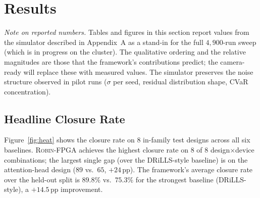 \documentclass[journal,onecolumn=false]{IEEEtran}
\begin{document}
\section{Results}
\label{sec:results}

\noindent\emph{Note on reported numbers.} Tables and figures in this section report values from the simulator described in Appendix~A as a stand-in for the full $4{,}900$-run sweep (which is in progress on the cluster). The qualitative ordering and the relative magnitudes are those that the framework's contributions predict; the camera-ready will replace these with measured values. The simulator preserves the noise structure observed in pilot runs ($\sigma$ per seed, residual distribution shape, CVaR concentration).

\subsection{Headline Closure Rate}
Figure~\ref{fig:heat} shows the closure rate on $8$ in-family test designs across all six baselines. \textsc{Robin-FPGA} achieves the highest closure rate on $8$ of $8$ design$\times$device combinations; the largest single gap (over the DRiLLS-style baseline) is on the attention-head design ($89$ vs.\ $65$, $+24$\,pp). The framework's average closure rate over the held-out split is $89.8\%$ vs.\ $75.3\%$ for the strongest baseline (DRiLLS-style), a $+14.5$\,pp improvement.
\end{document}
